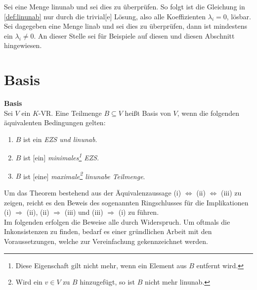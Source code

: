 Sei eine Menge \acl{linunab} und sei dies zu überprüfen. So folgt ist die Gleichung in \ref{def:linunab} nur durch die {\glqq}trivial[e]{\grqq} \cite[S. 307, 16.5]{Tut} Lösung, also alle Koeffizienten $\lambda_i = 0$, lösbar.
Sei dagegeben eine Menge \acl{linab} und sei dies zu überprüfen, dann ist mindestens ein $\lambda_i\not= 0$.
An dieser Stelle sei für Beispiele auf diesen und diesen Abschnitt hingewiesen.


\section{Basis}
\label{sec:Basis}

\theoremstyle{theo} \label{theo:Basis}
\begin{theo}{\textbf{Basis}}
\\ \glqq Sei $V$ ein $K$-\acl{VR}. Eine Teilmenge $B \subseteq V$ heißt Basis von $V$, wenn die folgenden äquivalenten Bedingungen gelten:
		\begin{enumerate}
		\item \label{Basis1} $B$ ist ein \emph{\acl{EZS} \emph{und} \acl{linunab}}.
		\item \label{Basis2}$B$ ist [ein] \emph{minimales\footnote{Diese Eigenschaft gilt nicht mehr, wenn ein Element aus $B$ entfernt wird.} \acl{EZS}}.
		\item \label{Basis3}$B$ ist [eine] \emph{maximale\footnote{Wird ein $v \in V$ zu $B$ hinzugefügt, so ist $B$ nicht mehr \acl{linunab}.} \acl{linunab}e Teilmenge}.{\grqq} \cite[S. 41, 9.16]{Skript}
		\end{enumerate}
\end{theo}

Um das Theorem bestehend aus der Äquivalenzaussage (i) $\Leftrightarrow$ (ii) $\Leftrightarrow$ (iii) zu zeigen, reicht es den Beweis des sogenannten Ringschlusses für die Implikationen (i) $\Rightarrow$ (ii), (ii) $\Rightarrow$ (iii) und (iii) $\Rightarrow$ (i) zu führen.
\\ Im folgenden erfolgen die Beweise alle durch Widerspruch. Um oftmals die Inkonsistenzen zu finden, bedarf es einer gründlichen Arbeit mit den Voraussetzungen, welche zur Vereinfachung gekennzeichnet werden.

